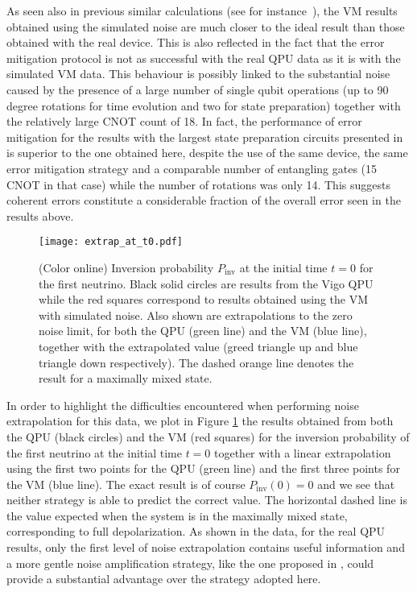 \documentclass[Dual]{msu-thesis}
\begin{document}
As seen also in previous similar calculations (see for instance~\cite{roggero2020A,Roggero_nptodg}), the VM results obtained using the simulated noise are much closer to the ideal result than those obtained with the real device. This is also reflected in the fact that the error mitigation protocol is not as successful with the real QPU data as it is with the simulated VM data. This behaviour is possibly linked to the substantial noise caused by the presence of a large number of single qubit operations (up to 90 degree rotations for time evolution and two for state preparation) together with the relatively large CNOT count of 18. In fact, the performance of error mitigation for the results with the largest state preparation circuits presented in~\cite{Roggero_nptodg} is superior to the one obtained here, despite the use of the same device, the same error mitigation strategy and a comparable number of entangling gates (15 CNOT in that case) while the number of rotations was only 14. This suggests coherent errors constitute a considerable fraction of the overall error seen in the results above.

\begin{figure}[t]
 \centering
 \texttt{[image: extrap\_at\_t0.pdf]}
 \caption{(Color online) Inversion probability $P_{\text{inv}}$ at the initial time $t=0$ for the first neutrino. Black solid circles are results from the Vigo QPU~\cite{IBMQ_Vigo} while the red squares correspond to results obtained using the VM with simulated noise. Also shown are extrapolations to the zero noise limit, for both the QPU (green line) and the VM (blue line), together with the extrapolated value (greed triangle up and blue triangle down respectively). The dashed orange line denotes the result for a maximally mixed state.}
\label{fig:pop_extrap}
\end{figure}

In order to highlight the difficulties encountered when performing noise extrapolation for this data, we plot in Figure \ref{fig:pop_extrap} the results obtained from both the QPU (black circles) and the VM (red squares) for the inversion probability of the first neutrino at the initial time $t=0$ together with a linear extrapolation using the first two points for the QPU (green line) and the first three points for the VM (blue line). The exact result is of course $P_{\text{inv}}(0)=0$ and we see that neither strategy is able to predict the correct value. The horizontal dashed line is the value expected when the system is in the maximally mixed state, corresponding to full depolarization. As shown in the data, for the real QPU results, only the first level of noise extrapolation contains useful information and a more gentle noise amplification strategy, like the one proposed in \cite{He2020}, could provide a substantial advantage over the strategy adopted here.
\end{document}
